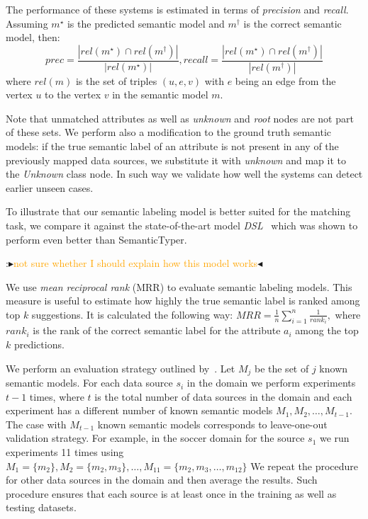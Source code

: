 \documentclass[letterpaper]{article} %
\newcommand{\authornote}[3]{
  {\fbox{\sc 
  #1}:$\blacktriangleright$\textcolor{#2}{\small{#3}}$\blacktriangleleft$}%
}
\newcommand{\npr}[1]{\authornote{NPR}{orange}{#1}}
\newcommand{\ignore}[1]{}
\begin{document}
The performance of these systems is estimated in terms of \emph{precision} and \emph{recall}.
Assuming $m^\star$ is the predicted semantic model and $m^\dag$ is the correct semantic model, then:
$$\mathit{prec} = \frac{|\mathit{rel}(m^\star)\cap 
\mathit{rel}(m^\dag)|}{|\mathit{rel}(m^\star)|}, 
\mathit{recall} = \frac{|\mathit{rel}(m^\star)\cap 
\mathit{rel}(m^\dag)|}{|\mathit{rel}(m^\dag)|}$$
where $rel(m)$ is the set of triples $(u,e,v)$ with $e$ being an edge from the vertex $u$ to the vertex $v$ in the semantic model $m$.
\ignore{Since we want to estimate the accuracy of both the matching and STP 
parts,
we also include triples for attributes and data nodes into the corresponding 
sets.}
Note that unmatched attributes as well as \emph{unknown} and \emph{root} nodes are not part of these sets.
We perform also a modification to the ground truth semantic models:
if the true semantic label of an attribute is not present in any of the previously mapped data sources,
we substitute it with \emph{unknown} and map it to the \emph{Unknown} class node.
In such way we validate how well the systems can detect earlier unseen cases.

To illustrate that our semantic labeling model is better suited for the
matching task, we compare it against the state-of-the-art model \emph{DSL}~\cite{Pham:semantic} which was shown to perform even better than SemanticTyper. 
\npr{not sure whether I should explain how this model works}
We use \emph{mean reciprocal rank} (MRR) to evaluate semantic labeling models.
This measure is useful to estimate how highly the true semantic label is ranked among top $k$ suggestions.
It is calculated the following way:
$MRR = \frac{1}{n}\sum_{i=1}^{n}{\frac{1}{rank_i}},$
where $rank_i$ is the rank of the correct semantic label for the attribute $a_i$ among the top $k$ predictions.


We perform an evaluation strategy outlined by~\cite{taheriyan2016learning}.
Let $M_j$ be the set of $j$ known semantic models.
For each data source $s_i$ in the domain we perform experiments $t-1$ times,
where $t$ is the total number of data sources in the domain and each experiment has a different number of known semantic models $M_1, M_2, \ldots, M_{t-1}$.
The case with $M_{t-1}$ known semantic models corresponds to leave-one-out validation strategy. 
For example, in the soccer domain for the source $s_1$ we run experiments 11 times using $M_1=\{m_2\}, M_2=\{m_2, m_3\}, \ldots, M_{11}=\{m_2, m_3, \ldots, m_{12}\}$
We repeat the procedure for other data sources in the domain and then average the results.
Such procedure ensures that each source is at least once in the training as well as testing datasets.
\end{document}
